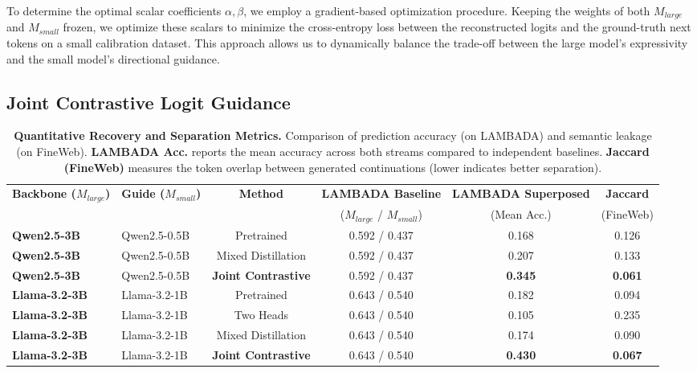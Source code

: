\documentclass{article}
\theoremstyle{plain}
\theoremstyle{definition}
\theoremstyle{remark}
\begin{document}
To determine the optimal scalar coefficients $\alpha, \beta$, we employ a gradient-based optimization procedure. Keeping the weights of both $M_{large}$ and $M_{small}$ frozen, we optimize these scalars to minimize the cross-entropy loss between the reconstructed logits and the ground-truth next tokens on a small calibration dataset. This approach allows us to dynamically balance the trade-off between the large model's expressivity and the small model's directional guidance.

\subsection{Joint Contrastive Logit Guidance}

\begin{table}[t!]
    \small
    \centering
    \caption{\textbf{Quantitative Recovery and Separation Metrics.} Comparison of prediction accuracy (on LAMBADA) and semantic leakage (on FineWeb). \textbf{LAMBADA Acc.} reports the mean accuracy across both streams compared to independent baselines. \textbf{Jaccard (FineWeb)} measures the token overlap between generated continuations (lower indicates better separation).}
    \label{tab:quant_metrics}
    \begin{tabular}{llcccc}
        \toprule
        \textbf{Backbone ($M_{large}$)} & \textbf{Guide ($M_{small}$)} & \textbf{Method} & \textbf{LAMBADA Baseline} & \textbf{LAMBADA Superposed} & \textbf{Jaccard} \\
        & & & ($M_{large}$ / $M_{small}$) & (Mean Acc.) & (FineWeb) \\
        \midrule
        \textbf{Qwen2.5-3B} & Qwen2.5-0.5B & Pretrained & 0.592 / 0.437 & 0.168 & 0.126 \\
        \textbf{Qwen2.5-3B} & Qwen2.5-0.5B & Mixed Distillation & 0.592 / 0.437 & 0.207 & 0.133 \\
        \textbf{Qwen2.5-3B} & Qwen2.5-0.5B & \textbf{Joint Contrastive} & 0.592 / 0.437 & \textbf{0.345} & \textbf{0.061} \\
        \midrule
        \textbf{Llama-3.2-3B} & Llama-3.2-1B & Pretrained & 0.643 / 0.540 & 0.182 & 0.094 \\
        \textbf{Llama-3.2-3B} & Llama-3.2-1B & Two Heads & 0.643 / 0.540 & 0.105 & 0.235 \\
        \textbf{Llama-3.2-3B} & Llama-3.2-1B & Mixed Distillation & 0.643 / 0.540 & 0.174 & 0.090 \\
        \textbf{Llama-3.2-3B} & Llama-3.2-1B & \textbf{Joint Contrastive} & 0.643 / 0.540 & \textbf{0.430} & \textbf{0.067} \\

\end{tabular}
\end{table}
\end{document}

